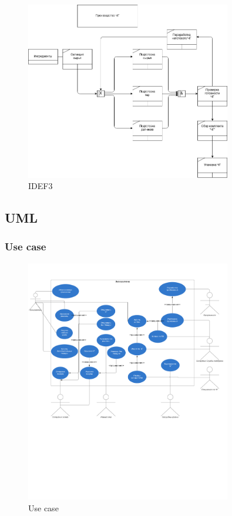 \documentclass[a4paper,8pt]{article}
\begin{document}
    \begin{figure}[h!]
        \includegraphics[width=0.8\textwidth]{./pics/IDEF3.png}
        \caption {IDEF3}
        \centering
    \end{figure}

\subsection{UML}


\subsubsection{Use case}

    \begin{figure}[h!]
        \includegraphics[width=0.8\textwidth]{./pics/use_case.pdf}
        \caption {Use case}
        \centering
    \end{figure}
\end{document}
